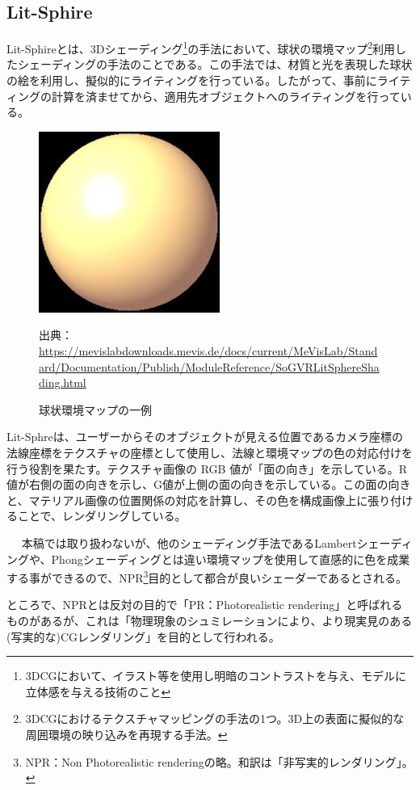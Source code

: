 \documentclass[dvipdfmx]{jsarticle}
\begin{document}
\subsection{Lit-Sphire}
Lit-Sphireとは、3Dシェーディング\footnote{3DCGにおいて、イラスト等を使用し明暗のコントラストを与え、モデルに立体感を与える技術のこと}の手法において、球状の環境マップ\footnote{3DCGにおけるテクスチャマッピングの手法の1つ。3D上の表面に擬似的な周囲環境の映り込みを再現する手法。}利用したシェーディングの手法のことである。この手法では、材質と光を表現した球状の絵を利用し、擬似的にライティングを行っている。したがって、事前にライティングの計算を済ませてから、適用先オブジェクトへのライティングを行っている。
\begin{figure}[H]
  \centering
  \includegraphics[scale=0.4]{images/lit_demo.png}
  \caption{球状環境マップの一例}
  出典：\url{https://mevislabdownloads.mevis.de/docs/current/MeVisLab/Standard/Documentation/Publish/ModuleReference/SoGVRLitSphereShading.html}
\end{figure}
Lit-Sphreは、ユーザーからそのオブジェクトが見える位置であるカメラ座標の法線座標をテクスチャの座標として使用し、法線と環境マップの色の対応付けを行う役割を果たす。テクスチャ画像の RGB 値が「面の向き」を示している。R 値が右側の面の向きを示し、G値が上側の面の向きを示している。この面の向きと、マテリアル画像の位置関係の対応を計算し、その色を構成画像上に張り付けることで、レンダリングしている。\par
　
本稿では取り扱わないが、他のシェーディング手法であるLambertシェーディングや、Phongシェーディングとは違い環境マップを使用して直感的に色を成業する事ができるので、NPR\footnote{NPR：Non Photorealistic renderingの略。和訳は「非写実的レンダリング」。}目的として都合が良いシェーダーであるとされる。\par
ところで、NPRとは反対の目的で「PR：Photorealistic rendering」と呼ばれるものがあるが、これは「物理現象のシュミレーションにより、より現実見のある(写実的な)CGレンダリング」を目的として行われる。
\end{document}
